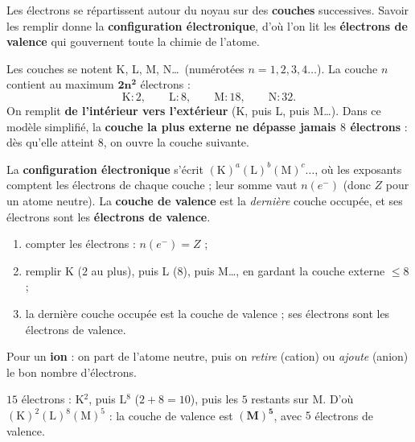 \documentclass[11pt,a4paper]{article}
\begin{document}

Les électrons se répartissent autour du noyau sur des \textbf{couches} successives. Savoir les remplir
donne la \textbf{configuration électronique}, d'où l'on lit les \textbf{électrons de valence} qui
gouvernent toute la chimie de l'atome.

\begin{cle}
Les couches se notent K, L, M, N\dots\ (numérotées $n = 1, 2, 3, 4\dots$). La couche $n$ contient au
maximum $\mathbf{2n^2}$ électrons :
\[ \text{K}:2,\qquad \text{L}:8,\qquad \text{M}:18,\qquad \text{N}:32. \]
On remplit \textbf{de l'intérieur vers l'extérieur} (K, puis L, puis M\dots). Dans ce modèle simplifié,
la \textbf{couche la plus externe ne dépasse jamais $8$ électrons} : dès qu'elle atteint $8$, on ouvre
la couche suivante.
\end{cle}

\begin{cle}
La \textbf{configuration électronique} s'écrit $(\mathrm{K})^a(\mathrm{L})^b(\mathrm{M})^c\dots$, où les
exposants comptent les électrons de chaque couche ; leur somme vaut $n(e^-)$ (donc $Z$ pour un atome
neutre). La \textbf{couche de valence} est la \emph{dernière} couche occupée, et ses électrons sont les
\textbf{électrons de valence}.
\end{cle}

\begin{methode}
\begin{enumerate}[leftmargin=1.7em,topsep=2pt,itemsep=1pt]
  \item compter les électrons : $n(e^-) = Z$ ;
  \item remplir K ($2$ au plus), puis L ($8$), puis M\dots, en gardant la couche externe $\le 8$ ;
  \item la dernière couche occupée est la couche de valence ; ses électrons sont les électrons de valence.
\end{enumerate}
Pour un \textbf{ion} : on part de l'atome neutre, puis on \emph{retire} (cation) ou \emph{ajoute}
(anion) le bon nombre d'électrons.
\end{methode}

\begin{exemplebox}[le phosphore $Z = 15$]
$15$ électrons : K$^2$, puis L$^8$ ($2+8=10$), puis les $5$ restants sur M. D'où
$(\mathrm{K})^2(\mathrm{L})^8(\mathrm{M})^5$ : la couche de valence est $\mathbf{(M)^5}$, avec $5$
électrons de valence.
\end{exemplebox}
\end{document}
